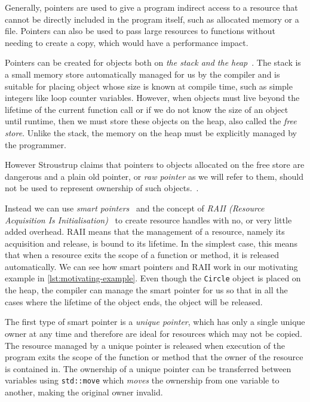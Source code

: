 \documentclass{mpaper}
\begin{document}
    Generally, pointers are used to give a program indirect access to a resource that cannot be directly included in the program itself, such as allocated memory or a file.
    Pointers can also be used to pass large resources to functions without needing to create a copy, which would have a performance impact. 
    
    Pointers can be created for objects both on \emph{the stack and the heap}~\cite{Stroustrup2000}. 
    The stack is a small memory store automatically managed for us by the compiler and is suitable for placing object whose size is known at compile time, such as simple integers like loop counter variables.
    However, when objects must live beyond the lifetime of the current function call or if we do not know the size of an object until runtime, then we must store these objects on the heap, also called the \emph{free store}. 
    Unlike the stack, the memory on the heap must be explicitly managed by the programmer.
    
    However Stroustrup claims that pointers to objects allocated on the free store are dangerous and a plain old pointer, or \emph{raw pointer} as we will refer to them, should not be used to represent ownership of such objects.~\cite{Stroustrup2018}.

    Instead we can use \emph{smart pointers}~\cite{Dimov2003} and the concept of \emph{RAII (Resource Acquisition Is Initialisation)}~\cite{Stroustrup2000} to create resource handles with no, or very little added overhead.
    RAII means that the management of a resource, namely its acquisition and release, is bound to its lifetime. 
    In the simplest case, this means that when a resource exits the scope of a function or method, it is released automatically.
    We can see how smart pointers and RAII work in our motivating example in  \autoref{lst:motivating-example}.
    Even though the \texttt{Circle} object is placed on the heap, the compiler can manage the smart pointer for us so that in all the cases where the lifetime of the object ends, the object will be released. 

    The first type of smart pointer is a \emph{unique pointer}, which has only a single unique owner at any time and therefore are ideal for resources which may not be copied.
    The resource managed by a unique pointer is released when execution of the program exits the scope of the function or method that the owner of the resource is contained in.
    The ownership of a unique pointer can be transferred between variables using \texttt{std::move} which \emph{moves} the ownership from one variable to another, making the original owner invalid.
\end{document}
